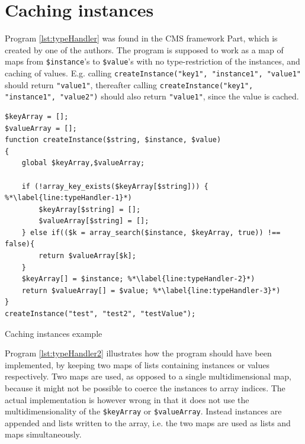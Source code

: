 \newpage
\section{Caching instances}
Program \ref{lst:typeHandler} was found in the CMS framework Part, which is created by one of the authors. The program is supposed to work as a map of maps from \texttt{\$instance}'s to \texttt{\$value}'s with no type-restriction of the instances, and caching of values. E.g. calling \texttt{createInstance("key1", "instance1", "value1"}  should return \texttt{"value1"}, thereafter calling \texttt{createInstance("key1", "instance1", "value2")} should also return \texttt{"value1"}, since the value is cached.

\begin{program}
\begin{lstlisting}
$keyArray = [];
$valueArray = [];
function createInstance($string, $instance, $value)
{
    global $keyArray,$valueArray;

    if (!array_key_exists($keyArray[$string])) {  %*\label{line:typeHandler-1}*)
        $keyArray[$string] = [];
        $valueArray[$string] = [];
    } else if(($k = array_search($instance, $keyArray, true)) !== false){
        return $valueArray[$k]; 
    }
    $keyArray[] = $instance; %*\label{line:typeHandler-2}*)
    return $valueArray[] = $value; %*\label{line:typeHandler-3}*)
}
createInstance("test", "test2", "testValue");
\end{lstlisting}
\caption{Caching instances example}
\label{lst:typeHandler}
\end{program}



Program \ref{lst:typeHandler2} illustrates how the program should have been implemented, by keeping two maps of lists containing instances or values respectively. Two maps are used, as opposed to a single multidimensional map, because it might not be possible to coerce the instances to array indices. The actual implementation is however wrong in that it does not use the multidimensionality of the \texttt{\$keyArray} or \texttt{\$valueArray}. Instead instances are appended and lists written to the array, i.e. the two maps are used as lists and maps simultaneously. 



